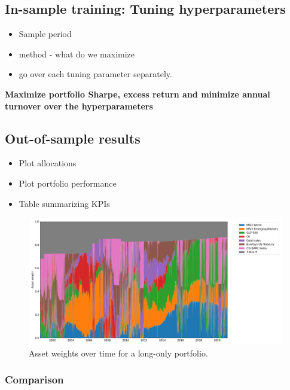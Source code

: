 \subsection{In-sample training: Tuning hyperparameters}



\begin{itemize}
    \item Sample period
    \item method - what do we maximize
    \item go over each tuning parameter separately.
\end{itemize}

\textbf{Maximize portfolio Sharpe, excess return and minimize annual turnover over the hyperparameters}

\subsection{Out-of-sample results}

\begin{itemize}
    \item Plot allocations
    \item Plot portfolio performance
    \item Table summarizing KPIs
\end{itemize}

\begin{figure}[H]
    \centering
    \includegraphics[width=1\textwidth]{analysis/portfolio_exercise/images/port_weights.png}
    \caption{Asset weights over time for a long-only portfolio.}
    \label{fig:MPC_port_weights}
\end{figure}




\subsubsection{Comparison}



